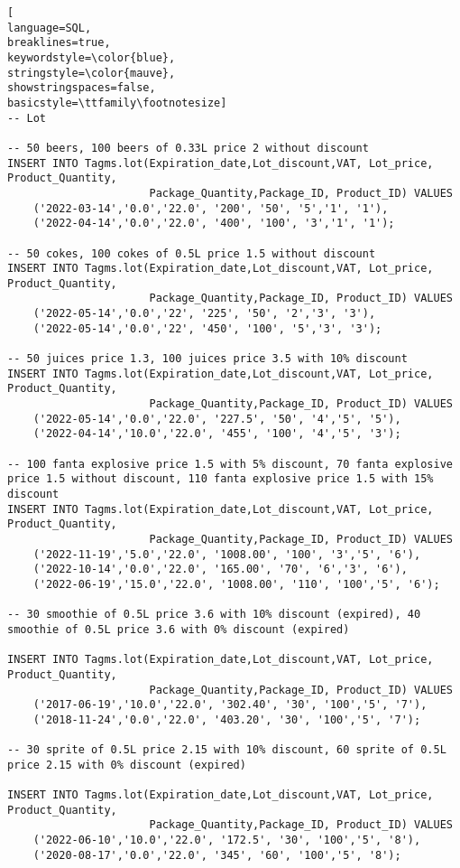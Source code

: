 \begin{lstlisting}[
language=SQL,
breaklines=true,
keywordstyle=\color{blue},
stringstyle=\color{mauve},
showstringspaces=false,
basicstyle=\ttfamily\footnotesize]
-- Lot

-- 50 beers, 100 beers of 0.33L price 2 without discount
INSERT INTO Tagms.lot(Expiration_date,Lot_discount,VAT, Lot_price, Product_Quantity,
                      Package_Quantity,Package_ID, Product_ID) VALUES
    ('2022-03-14','0.0','22.0', '200', '50', '5','1', '1'),
    ('2022-04-14','0.0','22.0', '400', '100', '3','1', '1');

-- 50 cokes, 100 cokes of 0.5L price 1.5 without discount
INSERT INTO Tagms.lot(Expiration_date,Lot_discount,VAT, Lot_price, Product_Quantity,
                      Package_Quantity,Package_ID, Product_ID) VALUES
    ('2022-05-14','0.0','22', '225', '50', '2','3', '3'),
    ('2022-05-14','0.0','22', '450', '100', '5','3', '3');

-- 50 juices price 1.3, 100 juices price 3.5 with 10% discount
INSERT INTO Tagms.lot(Expiration_date,Lot_discount,VAT, Lot_price, Product_Quantity,
                      Package_Quantity,Package_ID, Product_ID) VALUES
    ('2022-05-14','0.0','22.0', '227.5', '50', '4','5', '5'),
    ('2022-04-14','10.0','22.0', '455', '100', '4','5', '3');

-- 100 fanta explosive price 1.5 with 5% discount, 70 fanta explosive price 1.5 without discount, 110 fanta explosive price 1.5 with 15% discount
INSERT INTO Tagms.lot(Expiration_date,Lot_discount,VAT, Lot_price, Product_Quantity,
                      Package_Quantity,Package_ID, Product_ID) VALUES
    ('2022-11-19','5.0','22.0', '1008.00', '100', '3','5', '6'),
    ('2022-10-14','0.0','22.0', '165.00', '70', '6','3', '6'),
    ('2022-06-19','15.0','22.0', '1008.00', '110', '100','5', '6');

-- 30 smoothie of 0.5L price 3.6 with 10% discount (expired), 40 smoothie of 0.5L price 3.6 with 0% discount (expired)

INSERT INTO Tagms.lot(Expiration_date,Lot_discount,VAT, Lot_price, Product_Quantity,
                      Package_Quantity,Package_ID, Product_ID) VALUES
    ('2017-06-19','10.0','22.0', '302.40', '30', '100','5', '7'),
    ('2018-11-24','0.0','22.0', '403.20', '30', '100','5', '7');

-- 30 sprite of 0.5L price 2.15 with 10% discount, 60 sprite of 0.5L price 2.15 with 0% discount (expired)

INSERT INTO Tagms.lot(Expiration_date,Lot_discount,VAT, Lot_price, Product_Quantity,
                      Package_Quantity,Package_ID, Product_ID) VALUES
    ('2022-06-10','10.0','22.0', '172.5', '30', '100','5', '8'),
    ('2020-08-17','0.0','22.0', '345', '60', '100','5', '8');



\end{lstlisting}
